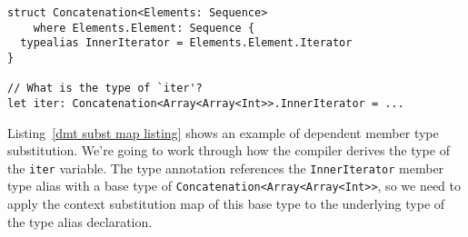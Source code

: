 \documentclass[../generics]{subfiles}
\begin{document}
\begin{listing}\label{dmt subst map listing}
\begin{Verbatim}
struct Concatenation<Elements: Sequence>
    where Elements.Element: Sequence {
  typealias InnerIterator = Elements.Element.Iterator
}

// What is the type of `iter'?
let iter: Concatenation<Array<Array<Int>>.InnerIterator = ...
\end{Verbatim}
\end{listing}
\begin{example}
Listing~\ref{dmt subst map listing} shows an example of dependent member type substitution. We're going to work through how the compiler derives the type of the \texttt{iter} variable.
The type annotation references the \texttt{InnerIterator} member type alias with a base type of \texttt{Concatenation<Array<Array<Int>>}, so we need to apply the context substitution map of this base type to the underlying type of the type alias declaration.


\end{example}
\end{document}
